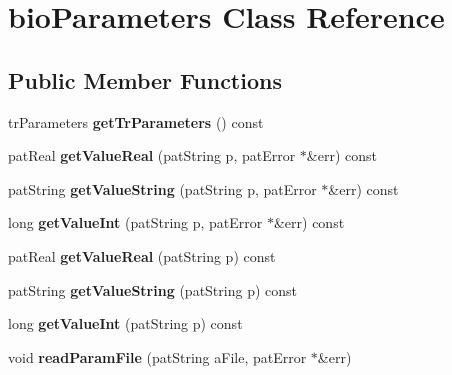 \hypertarget{classbio_parameters}{}\section{bio\+Parameters Class Reference}
\label{classbio_parameters}
\subsection*{Public Member Functions}
\begin{DoxyCompactItemize}
\item 
\mbox{\label{classbio_parameters_a07474197dbbbad5a77e4bec9e533f9e8}} 
tr\+Parameters {\bfseries get\+Tr\+Parameters} () const
\item 
\mbox{\label{classbio_parameters_ac71c0e7f4d2f950b3f8396dfa83616a8}} 
pat\+Real {\bfseries get\+Value\+Real} (pat\+String p, pat\+Error $\ast$\&err) const
\item 
\mbox{\label{classbio_parameters_afa93f84dea68d42d71129a5eabedaae2}} 
pat\+String {\bfseries get\+Value\+String} (pat\+String p, pat\+Error $\ast$\&err) const
\item 
\mbox{\label{classbio_parameters_a33d97281a04bbb210641633be3e7fc6a}} 
long {\bfseries get\+Value\+Int} (pat\+String p, pat\+Error $\ast$\&err) const
\item 
\mbox{\label{classbio_parameters_aec88435b040d2f2138808b694f6dcd5f}} 
pat\+Real {\bfseries get\+Value\+Real} (pat\+String p) const
\item 
\mbox{\label{classbio_parameters_afeb28ad19d57d2ffa15768033c7072e9}} 
pat\+String {\bfseries get\+Value\+String} (pat\+String p) const
\item 
\mbox{\label{classbio_parameters_a37c51ee65c5f099a6c6e0205bff13318}} 
long {\bfseries get\+Value\+Int} (pat\+String p) const
\item 
\mbox{\label{classbio_parameters_a68feca386422eb93775c6b4aae491edb}} 
void {\bfseries read\+Param\+File} (pat\+String a\+File, pat\+Error $\ast$\&err)

\end{DoxyCompactItemize}
